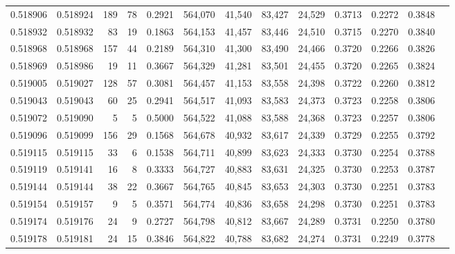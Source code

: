 \begin{tabular}{rrrrrrrrrrrrr}
0.518906 & 0.518924 &   189 &    78 &                                     0.2921 & 564,070 &  41,540 &  83,427 &  24,529 & 0.3713 & 0.2272 & 0.3848 \\
0.518932 & 0.518932 &    83 &    19 &                                     0.1863 & 564,153 &  41,457 &  83,446 &  24,510 & 0.3715 & 0.2270 & 0.3840 \\
0.518968 & 0.518968 &   157 &    44 &                                     0.2189 & 564,310 &  41,300 &  83,490 &  24,466 & 0.3720 & 0.2266 & 0.3826 \\
0.518969 & 0.518986 &    19 &    11 &                                     0.3667 & 564,329 &  41,281 &  83,501 &  24,455 & 0.3720 & 0.2265 & 0.3824 \\
0.519005 & 0.519027 &   128 &    57 &                                     0.3081 & 564,457 &  41,153 &  83,558 &  24,398 & 0.3722 & 0.2260 & 0.3812 \\
0.519043 & 0.519043 &    60 &    25 &                                     0.2941 & 564,517 &  41,093 &  83,583 &  24,373 & 0.3723 & 0.2258 & 0.3806 \\
0.519072 & 0.519090 &     5 &     5 &                                     0.5000 & 564,522 &  41,088 &  83,588 &  24,368 & 0.3723 & 0.2257 & 0.3806 \\
0.519096 & 0.519099 &   156 &    29 &                                     0.1568 & 564,678 &  40,932 &  83,617 &  24,339 & 0.3729 & 0.2255 & 0.3792 \\
0.519115 & 0.519115 &    33 &     6 &                                     0.1538 & 564,711 &  40,899 &  83,623 &  24,333 & 0.3730 & 0.2254 & 0.3788 \\
0.519119 & 0.519141 &    16 &     8 &                                     0.3333 & 564,727 &  40,883 &  83,631 &  24,325 & 0.3730 & 0.2253 & 0.3787 \\
0.519144 & 0.519144 &    38 &    22 &                                     0.3667 & 564,765 &  40,845 &  83,653 &  24,303 & 0.3730 & 0.2251 & 0.3783 \\
0.519154 & 0.519157 &     9 &     5 &                                     0.3571 & 564,774 &  40,836 &  83,658 &  24,298 & 0.3730 & 0.2251 & 0.3783 \\
0.519174 & 0.519176 &    24 &     9 &                                     0.2727 & 564,798 &  40,812 &  83,667 &  24,289 & 0.3731 & 0.2250 & 0.3780 \\
0.519178 & 0.519181 &    24 &    15 &                                     0.3846 & 564,822 &  40,788 &  83,682 &  24,274 & 0.3731 & 0.2249 & 0.3778 \\

\end{tabular}
